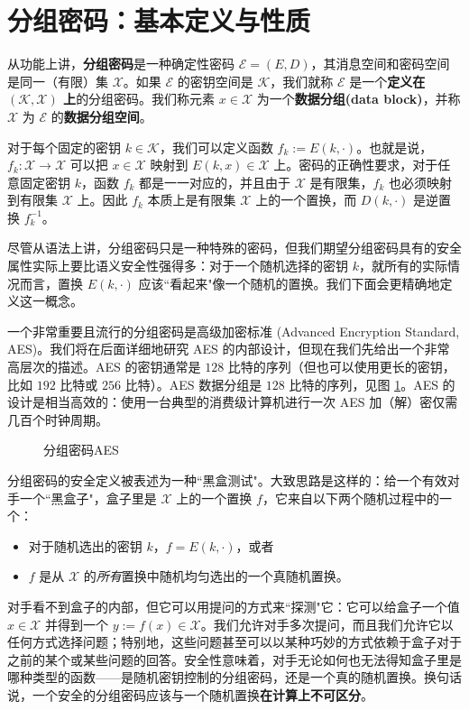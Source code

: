 \section{分组密码：基本定义与性质}

从功能上讲，\textbf{分组密码}是一种确定性密码 $\mathcal{E}=(E,D)$，其消息空间和密码空间是同一（有限）集 $\mathcal{X}$。如果 $\mathcal{E}$ 的密钥空间是 $\mathcal{K}$，我们就称 $\mathcal{E}$ 是一个\textbf{定义在 $(\mathcal{K},\mathcal{X})$ 上}的分组密码。我们称元素 $x\in\mathcal{X}$ 为一个\textbf{数据分组(data block)}，并称 $\mathcal{X}$ 为 $\mathcal{E}$ 的\textbf{数据分组空间}。

对于每个固定的密钥 $k\in\mathcal{K}$，我们可以定义函数 $f_k:=E(k,\cdot)$。也就是说，$f_k:\mathcal{X}\to\mathcal{X}$ 可以把 $x\in\mathcal{X}$ 映射到 $E(k,x)\in\mathcal{X}$ 上。密码的正确性要求，对于任意固定密钥 $k$，函数 $f_k$ 都是一一对应的，并且由于 $\mathcal{X}$ 是有限集，$f_k$ 也必须映射到有限集 $\mathcal{X}$ 上。因此 $f_k$ 本质上是有限集 $\mathcal{X}$ 上的一个置换，而 $D(k,\cdot)$ 是逆置换 $f^{-1}_k$。

尽管从语法上讲，分组密码只是一种特殊的密码，但我们期望分组密码具有的安全属性实际上要比语义安全性强得多：对于一个随机选择的密钥 $k$，就所有的实际情况而言，置换 $E(k,\cdot)$ 应该``看起来"像一个随机的置换。我们下面会更精确地定义这一概念。

一个非常重要且流行的分组密码是高级加密标准 (Advanced Encryption Standard, AES)。我们将在后面详细地研究 AES 的内部设计，但现在我们先给出一个非常高层次的描述。AES 的密钥通常是 $128$ 比特的序列（但也可以使用更长的密钥，比如 $192$ 比特或 $256$ 比特）。AES 数据分组是 $128$ 比特的序列，见图 \ref{fig:4-1}。AES 的设计是相当高效的：使用一台典型的消费级计算机进行一次 AES 加（解）密仅需几百个时钟周期。

\begin{figure}
  \centering
  
  \caption{分组密码AES}
  \label{fig:4-1}
\end{figure}

分组密码的安全定义被表述为一种``黑盒测试"。大致思路是这样的：给一个有效对手一个``黑盒子"，盒子里是 $\mathcal{X}$ 上的一个置换 $f$，它来自以下两个随机过程中的一个：
\begin{itemize}
	\item 对于随机选出的密钥 $k$，$f=E(k,\cdot)$，或者
	\item $f$ 是从 $\mathcal{X}$ 的\emph{所有}置换中随机均匀选出的一个真随机置换。
\end{itemize}
对手看不到盒子的内部，但它可以用提问的方式来``探测"它：它可以给盒子一个值 $x\in\mathcal{X}$ 并得到一个 $y:=f(x)\in\mathcal{X}$。我们允许对手多次提问，而且我们允许它以任何方式选择问题；特别地，这些问题甚至可以以某种巧妙的方式依赖于盒子对于之前的某个或某些问题的回答。安全性意味着，对手无论如何也无法得知盒子里是哪种类型的函数——是随机密钥控制的分组密码，还是一个真的随机置换。换句话说，一个安全的分组密码应该与一个随机置换\textbf{在计算上不可区分}。

